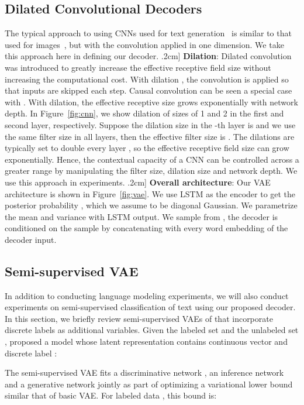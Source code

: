 \documentclass{article}
\begin{document}
\subsection{Dilated Convolutional Decoders \label{cnn_sec}}
The typical approach to using CNNs used for text generation~\cite{kalchbrenner2016neural} is
similar to that used for images~\cite{krizhevsky2012imagenet,he2016deep},
but with the convolution applied in one dimension. We take this approach here in defining our decoder.
\0.2cm]
{\bf Dilation}: Dilated convolution~\cite{yu2015multi} was introduced to greatly increase the
effective receptive field size without increasing the computational cost. With
dilation , the convolution is applied so that  inputs are skipped each step.
Causal convolution can be seen a special case with . With dilation, the effective
receptive size grows exponentially with network depth. In
Figure~\ref{fig:cnn}, we show dilation of sizes of 1 and 2 in the first and second layer, respectively. Suppose the dilation size in the -th layer is  and we use the same filter
size  in all layers, then the effective filter size is .
The dilations are typically set to double every layer ,
so the effective receptive field size can grow exponentially. Hence, the contextual capacity
of a CNN can be controlled across a greater range by manipulating the filter size, dilation size and network depth. We use this approach in experiments.
\0.2cm]
{\bf Overall architecture}: Our VAE architecture is shown in Figure~\ref{fig:vae}.
We use LSTM as the encoder to get the posterior probability
, which we assume to be
diagonal Gaussian. We parametrize the mean  and
variance  with LSTM output. We sample  from
, the decoder is conditioned on the sample by
concatenating  with every word embedding of the decoder input.

\subsection{Semi-supervised VAE}
In addition to conducting language modeling experiments, we will also conduct experiments on semi-supervised classification of text using our proposed decoder.
In this section, we briefly review
semi-supervised VAEs of \cite{kingma2014semi} that incorporate discrete labels as additional variables.
Given the labeled set
 and the unlabeled set
, \cite{kingma2014semi} proposed a model
whose latent representation contains continuous vector  and discrete label
:

The semi-supervised VAE fits a discriminative network
, an inference network
 and a generative network
 jointly as part of optimizing a variational lower
bound similar that of basic VAE. For labeled data ,
this bound is:
\end{document}
